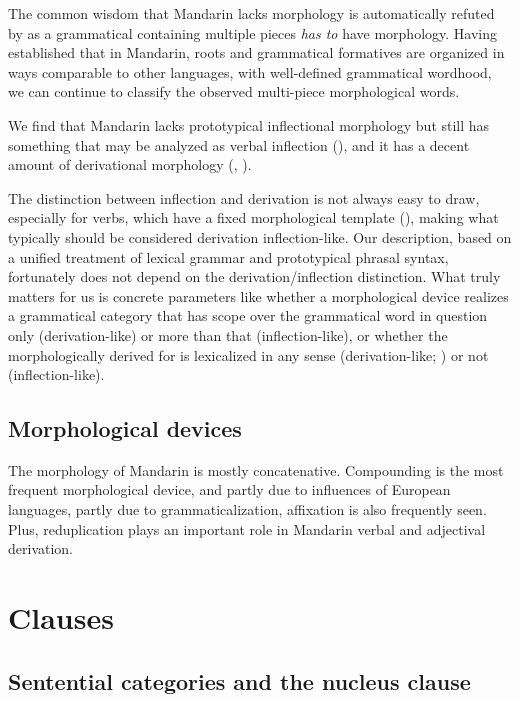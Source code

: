 \documentclass[UTF8, a4paper, oneside, scheme=plain, 12pt]{ctexrep}
\begin{document}
The common wisdom that Mandarin lacks morphology is automatically refuted
by 
as a grammatical containing multiple pieces \emph{has to} have morphology.
Having established that in Mandarin, roots and grammatical formatives are organized 
in ways comparable to other languages,
with well-defined grammatical wordhood,
we can continue to classify the observed multi-piece morphological words.

We find that Mandarin lacks prototypical inflectional morphology 
but still has something that may be analyzed as verbal inflection (),
and it has a decent amount of derivational morphology
(,
).

The distinction between inflection and derivation is not always easy to draw,
especially for verbs,
which have a fixed morphological template (),
making what typically should be considered derivation inflection-like.
Our description, based on a unified treatment of lexical grammar and prototypical phrasal syntax,
fortunately does not depend on the derivation/inflection distinction.
What truly matters for us is concrete parameters like whether a morphological device
realizes a grammatical category that has scope over the grammatical word in question only
(derivation-like) or more than that (inflection-like),
or whether the morphologically derived for is lexicalized in any sense (derivation-like; )
or not (inflection-like).

\subsection{Morphological devices}

The morphology of Mandarin is mostly concatenative.
Compounding is the most frequent morphological device,
and partly due to influences of European languages, partly due to grammaticalization,
affixation is also frequently seen.
Plus, reduplication plays an important role in Mandarin verbal and adjectival derivation.

\section{Clauses}\label{sec:grammatical.clause}

\subsection{Sentential categories and the nucleus clause}\label{sec:grammatical.clause.high-level}
\end{document}
